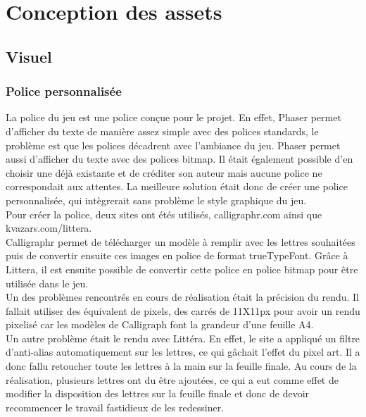 \documentclass[11pt]{article}
\begin{document}
\section{Conception des assets}
\subsection{Visuel}
\subsubsection{Police personnalisée}
La police du jeu est une police conçue pour le projet. En effet, Phaser permet d'afficher du texte de manière assez simple avec des polices standards, le problème est que les polices décadrent avec l'ambiance du jeu. Phaser permet aussi d'afficher du texte avec des polices bitmap. Il était également possible d'en choisir une déjà existante et de créditer son auteur mais aucune police ne correspondait aux attentes. La meilleure solution était donc de créer une police personnalisée, qui intègrerait sans problème le style graphique du jeu. \\

Pour créer la police, deux sites ont étés utilisés, calligraphr.com ainsi que kvazars.com/littera.\\ Calligraphr permet de télécharger un modèle à remplir avec les lettres souhaitées puis de convertir ensuite ces images en police de format trueTypeFont. Grâce à Littera, il est ensuite possible de convertir cette police en police bitmap pour être utilisée dans le jeu. \\

Un des problèmes rencontrés en cours de réalisation était la précision du rendu. Il fallait utiliser des équivalent de pixels, des carrés de 11X11px pour avoir un rendu pixelisé car les modèles de Calligraph font la grandeur d'une feuille A4. \\
Un autre problème était le rendu avec Littéra. En effet, le site a appliqué un filtre d'anti-alias automatiquement sur les lettres, ce qui gâchait l'effet du pixel art. Il a donc fallu retoucher toute les lettres à la main sur la feuille finale. Au cours de la réalisation, plusieurs lettres ont du être ajoutées, ce qui a eut comme effet de modifier la disposition des lettres sur la feuille finale et donc de devoir recommencer le travail fastidieux de les redessiner. 
\end{document}
